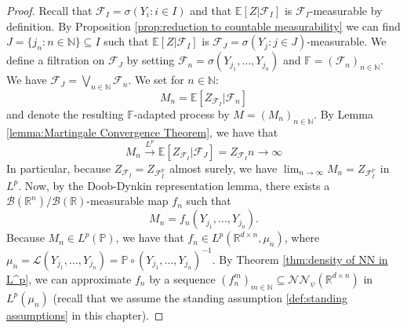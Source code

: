 \documentclass[11pt,a4paper,twoside,openany]{report}
\numberwithin{equation}{section}
\theoremstyle{plain} %
\theoremstyle{definition} %
\theoremstyle{remark} %
\begin{document}
\begin{proof}
Recall that \(\mathcal{F}_I=\sigma(Y_i:i\in I)\) and that \(\mathbb{E}[Z|\mathcal{F}_I]\) is \(\mathcal{F}_I\)-measurable by definition. 
By Proposition \ref{prop:reduction to countable measurability} we can find \(J= \{j_n:n\in\mathbb{N}\}\subseteq I\) such that \(\mathbb{E}[Z|\mathcal{F}_I]\) is \(\mathcal{F}_J=\sigma(Y_j:j\in J)\)-measurable. We define a filtration on \(\mathcal{F}_J\) by setting \(\mathcal{F}_n=\sigma(Y_{j_1},\dots,Y_{j_n})\) and \(\mathbb{F}=(\mathcal{F}_{n})_{n\in\mathbb{N}}\). We have \(\mathcal{F}_J=\bigvee_{n\in\mathbb{N}}\mathcal{F}_n\). We set for \(n\in\mathbb{N}\):
\begin{equation*}
    M_n=\mathbb{E}[Z_{\mathcal{F}_I}|\mathcal{F}_n]
\end{equation*}
and denote the resulting \(\mathbb{F}\)-adapted process by \(M=(M_n)_{n\in\mathbb{N}}\). By Lemma \ref{lemma:Martingale Convergence Theorem}, we have that 
\begin{equation*}
    M_n\overset{L^p}{\to}\mathbb{E}[Z_{\mathcal{F}_I}|\mathcal{F}_J]=Z_{\mathcal{F}_I} n\to\infty
\end{equation*}
In particular, because \(Z_{\mathcal{F}_I}=Z_{\mathcal{F}_I^{\mathbb{P}}}\) almost surely, we have \(\lim_{n\to\infty}M_n=Z_{\mathcal{F}_I^{\mathbb{P}}}\) in \(L^p\). Now, by the Doob-Dynkin representation lemma, there exists a \(\mathcal{B}(\mathbb{R}^n)/\mathcal{B}(\mathbb{R})\)-measurable map \(f_n\) such that 
\begin{equation*}
    M_n = f_n(Y_{j_1},\dots,Y_{j_n}).
\end{equation*}
Because \(M_n\in L^p(\mathbb{P})\), we have that \(f_n\in L^p(\mathbb{R}^{d\times n},\mu_n)\), where \(\mu_n=\mathcal{L}(Y_{j_1},\dots,Y_{j_n})=\mathbb{P}\circ(Y_{j_1},\dots,Y_{j_n})^{-1}\). By Theorem \ref{thm:density of NN in L^p}, we can approximate \(f_n\) by a sequence \((f_n^m)_{m\in\mathbb{N}}\subseteq \mathcal{NN}_\psi({\mathbb{R}^{d\times n}})\) in \(L^p(\mu_n)\) (recall that we assume the standing assumption \ref{def:standing assumptions} in this chapter). 



\end{proof}
\end{document}
